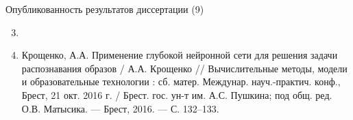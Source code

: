 \documentclass[10pt]{beamer}
\begin{document}
        \begin{frame}{Опубликованность результатов диссертации (9)}
            \footnotesize
            \begin{enumerate}
                \setcounter{enumi}{2}
                \item {}
                \item Крощенко, А.А. Применение глубокой нейронной сети для решения задачи распознавания образов / А.А. Крощенко // Вычислительные методы, модели и образовательные технологии : сб. матер. Междунар. науч.-практич. конф., Брест, 21 окт. 2016 г. / Брест. гос. ун-т им. А.С. Пушкина; под общ. ред. О.В. Матысика. --- Брест, 2016. --- С. 132--133.
            \end{enumerate}
        \end{frame}

\end{document}

